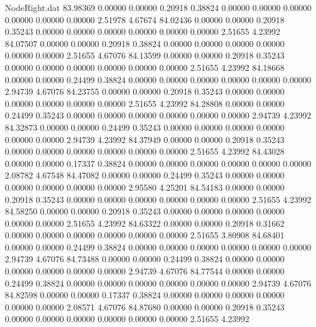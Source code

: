 \begin{filecontents}{NodeRight.dat}
  83.98369    0.00000    0.00000     0.20918    0.38824    0.00000    0.00000    0.00000    0.00000    0.00000    0.00000    2.51978    4.67674
  84.02436    0.00000    0.00000     0.20918    0.35243    0.00000    0.00000    0.00000    0.00000    0.00000    0.00000    2.51655    4.23992
  84.07507    0.00000    0.00000     0.20918    0.38824    0.00000    0.00000    0.00000    0.00000    0.00000    0.00000    2.51655    4.67076
  84.13599    0.00000    0.00000     0.20918    0.35243    0.00000    0.00000    0.00000    0.00000    0.00000    0.00000    2.51655    4.23992
  84.18668    0.00000    0.00000     0.24499    0.38824    0.00000    0.00000    0.00000    0.00000    0.00000    0.00000    2.94739    4.67076
  84.23755    0.00000    0.00000     0.20918    0.35243    0.00000    0.00000    0.00000    0.00000    0.00000    0.00000    2.51655    4.23992
  84.28808    0.00000    0.00000     0.24499    0.35243    0.00000    0.00000    0.00000    0.00000    0.00000    0.00000    2.94739    4.23992
  84.32873    0.00000    0.00000     0.24499    0.35243    0.00000    0.00000    0.00000    0.00000    0.00000    0.00000    2.94739    4.23992
  84.37949    0.00000    0.00000     0.20918    0.35243    0.00000    0.00000    0.00000    0.00000    0.00000    0.00000    2.51655    4.23992
  84.43028    0.00000    0.00000     0.17337    0.38824    0.00000    0.00000    0.00000    0.00000    0.00000    0.00000    2.08782    4.67548
  84.47082    0.00000    0.00000     0.24499    0.35243    0.00000    0.00000    0.00000    0.00000    0.00000    0.00000    2.95580    4.25201
  84.54183    0.00000    0.00000     0.20918    0.35243    0.00000    0.00000    0.00000    0.00000    0.00000    0.00000    2.51655    4.23992
  84.58250    0.00000    0.00000     0.20918    0.35243    0.00000    0.00000    0.00000    0.00000    0.00000    0.00000    2.51655    4.23992
  84.63322    0.00000    0.00000     0.20918    0.31662    0.00000    0.00000    0.00000    0.00000    0.00000    0.00000    2.51655    3.80908
  84.68401    0.00000    0.00000     0.24499    0.38824    0.00000    0.00000    0.00000    0.00000    0.00000    0.00000    2.94739    4.67076
  84.73488    0.00000    0.00000     0.24499    0.38824    0.00000    0.00000    0.00000    0.00000    0.00000    0.00000    2.94739    4.67076
  84.77544    0.00000    0.00000     0.24499    0.38824    0.00000    0.00000    0.00000    0.00000    0.00000    0.00000    2.94739    4.67076
  84.82598    0.00000    0.00000     0.17337    0.38824    0.00000    0.00000    0.00000    0.00000    0.00000    0.00000    2.08571    4.67076
  84.87680    0.00000    0.00000     0.20918    0.35243    0.00000    0.00000    0.00000    0.00000    0.00000    0.00000    2.51655    4.23992

\end{filecontents}
